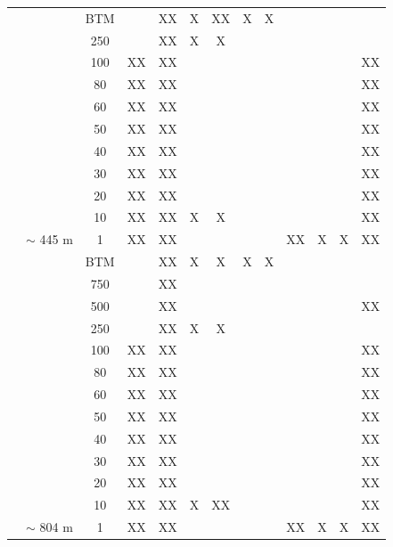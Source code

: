 \documentclass[12pt]{article}\usepackage[]{graphicx}\usepackage[]{color}
\begin{document}
\begin{landscapepage}
\begin{longtable}[t]{ccccccccccccc}
\endfoot
\bottomrule
\endlastfoot
 &  & BTM &  & XX & X & XX & X & X &  &  &  & \\
\nopagebreak
 &  & 250 &  & XX & X & X &  &  &  &  &  & \\
\nopagebreak
 &  & 100 & XX & XX &  &  &  &  &  &  &  & XX\\
\nopagebreak
 &  & 80 & XX & XX &  &  &  &  &  &  &  & XX\\
\nopagebreak
 &  & 60 & XX & XX &  &  &  &  &  &  &  & XX\\
\nopagebreak
 &  & 50 & XX & XX &  &  &  &  &  &  &  & XX\\
\nopagebreak
 &  & 40 & XX & XX &  &  &  &  &  &  &  & XX\\
\nopagebreak
 &  & 30 & XX & XX &  &  &  &  &  &  &  & XX\\
\nopagebreak
 &  & 20 & XX & XX &  &  &  &  &  &  &  & XX\\
\nopagebreak
 &  & 10 & XX & XX & X & X &  &  &  &  &  & XX\\
\nopagebreak
\multirow{-11}{*}{\centering\arraybackslash GULD\_03} & \multirow{-11}{*}{\centering\arraybackslash $\sim$ 445 m} & 1 & XX & XX &  &  &  &  & XX & X & X & XX\\
\cmidrule{1-13}\pagebreak[0]
 &  & BTM &  & XX & X & X & X & X &  &  &  & \\
\nopagebreak
 &  & 750 &  & XX &  &  &  &  &  &  &  & \\
\nopagebreak
 &  & 500 &  & XX &  &  &  &  &  &  &  & XX\\
\nopagebreak
 &  & 250 &  & XX & X & X &  &  &  &  &  & \\
\nopagebreak
 &  & 100 & XX & XX &  &  &  &  &  &  &  & XX\\
\nopagebreak
 &  & 80 & XX & XX &  &  &  &  &  &  &  & XX\\
\nopagebreak
 &  & 60 & XX & XX &  &  &  &  &  &  &  & XX\\
\nopagebreak
 &  & 50 & XX & XX &  &  &  &  &  &  &  & XX\\
\nopagebreak
 &  & 40 & XX & XX &  &  &  &  &  &  &  & XX\\
\nopagebreak
 &  & 30 & XX & XX &  &  &  &  &  &  &  & XX\\
\nopagebreak
 &  & 20 & XX & XX &  &  &  &  &  &  &  & XX\\
\nopagebreak
 &  & 10 & XX & XX & X & XX &  &  &  &  &  & XX\\
\nopagebreak
\multirow{-13}{*}{\centering\arraybackslash SG\_28} & \multirow{-13}{*}{\centering\arraybackslash $\sim$ 804 m} & 1 & XX & XX &  &  &  &  & XX & X & X & XX\\

\end{longtable}
\end{landscapepage}
\end{document}
